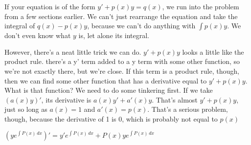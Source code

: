 \documentclass[12pt, letterpaper]{article}
\begin{document}
If your equation is of the form $y' + p(x)y = q(x)$, we run into the problem from a few sections earlier.
We can't just rearrange the equation and take the integral of $q(x) - p(x)y$, because we can't do anything with $\int p(x)y$.
We don't even know what $y$ is, let alone its integral.

However, there's a neat little trick we can do.
$y' + p(x)y$ looks a little like the product rule.
there's a y' term added to a y term with some other function,
so we're not exactly there, but we're close.
If this term is a product rule, though, then we can find some other function
that has a derivative equal to $y' + p(x)y$. What is that function?
We need to do some tinkering first. If we take $(a(x)y)'$, its derivative is
$a(x)y' + a'(x)y$. That's almost $y' + p(x)y$, just so long as $a(x) = 1$ and $a'(x) = p(x)$.
That's a serious problem, though, because the derivative of 1 is 0, which is probably not equal to $p(x)$

$(ye^{\int P(x) \, dx})' = y'e^{\int P(x) \, dx} + P(x)ye^{\int P(x) \, dx}$
\end{document}
